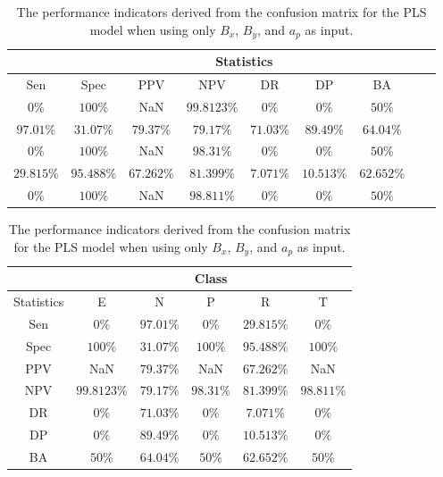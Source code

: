 \begin{table}[!ht]
	\centering
	\begin{tabular}{|c|c|c|c|c|c|c|c|c|}
		\hline
		 & \multicolumn{7}{c|}{Statistics} \\ \hline
		Sen & Spec & PPV & NPV & DR & DP & BA \\ \hline
		$0\%$ & $100\%$ & NaN & $99.8123\%$ & $0\%$ & $0\%$ & $50\%$ \\ \hline
		$97.01\%$ & $31.07\%$ & $79.37\%$ & $79.17\%$ & $71.03\%$ & $89.49\%$ & $64.04\%$ \\ \hline
		$0\%$ & $100\%$ & NaN & $98.31\%$ & $0\%$ & $0\%$ & $50\%$ \\ \hline
		$29.815\%$ & $95.488\%$ & $67.262\%$ & $81.399\%$ & $7.071\%$ & $10.513\%$ & $62.652\%$ \\ \hline
		$0\%$ & $100\%$ & NaN & $98.811\%$ & $0\%$ & $0\%$ & $50\%$ \\ \hline
	\end{tabular}
	\caption{The performance indicators derived from the confusion matrix for the PLS model when using only $B_{x}$, $B_{y}$, and $a_{p}$ as input.}
	\label{tab:cs:xyap:pls}
\end{table}

\begin{table}[!ht]
	\centering
	\begin{tabular}{|c|c|c|c|c|c|}
		\hline
		 & \multicolumn{5}{c|}{Class} \\ \hline
		Statistics & E & N & P & R & T \\ \hline
		Sen & $0\%$ & $97.01\%$ & $0\%$ & $29.815\%$ & $0\%$ \\ \hline
		Spec & $100\%$ & $31.07\%$ & $100\%$ & $95.488\%$ & $100\%$ \\ \hline
		PPV & NaN & $79.37\%$ & NaN & $67.262\%$ & NaN \\ \hline
		NPV & $99.8123\%$ & $79.17\%$ & $98.31\%$ & $81.399\%$ & $98.811\%$ \\ \hline
		DR & $0\%$ & $71.03\%$ & $0\%$ & $7.071\%$ & $0\%$ \\ \hline
		DP & $0\%$ & $89.49\%$ & $0\%$ & $10.513\%$ & $0\%$ \\ \hline
		BA & $50\%$ & $64.04\%$ & $50\%$ & $62.652\%$ & $50\%$ \\ \hline
	\end{tabular}
	\caption{The performance indicators derived from the confusion matrix for the PLS model when using only $B_{x}$, $B_{y}$, and $a_{p}$ as input.}
	\label{tab:cs:reverse:xyap:pls}
\end{table}

